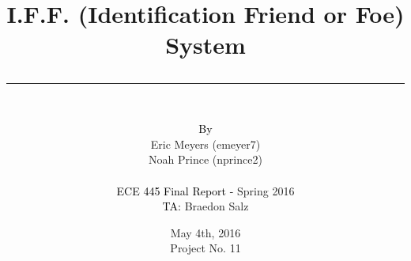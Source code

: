 \documentclass[letterpaper,10pt]{article}
\author{\vspace{.4in}\\
	\textcolor{black}{By}\\
	#1
	\vspace{1in}\\
	\textcolor{black}{ECE 445 Final Report -} #2\\
	\textcolor{black}{TA:} #3
	\vspace{1in}}
\newcommand{\thetitle}[1]{\title{\begin{huge}{\bf #1}\end{huge} \color{subtitlecolor}\rule[25pt]{\textwidth}{1pt}}}
\newcommand{\theauthor}[3]{
	\author{\vspace{.4in}\\
	\textcolor{black}{By}\\
	#1
	\vspace{1in}\\
	\textcolor{black}{ECE 445 Final Report -} #2\\
	\textcolor{black}{TA:} #3
	\vspace{1in}}
}
\begin{document}
\pagestyle{empty}
\doublespacing

\thetitle{{I.F.F. (Identification Friend or Foe) System}}

\theauthor{
	{Eric Meyers (emeyer7)}\\
	{Noah Prince (nprince2)}\\
}
{ %
	{Spring 2016}
}
{ %
	{Braedon Salz}
}

\date{
{May 4th, 2016}\\
Project No. 11
\clearpage
}
\end{document}

